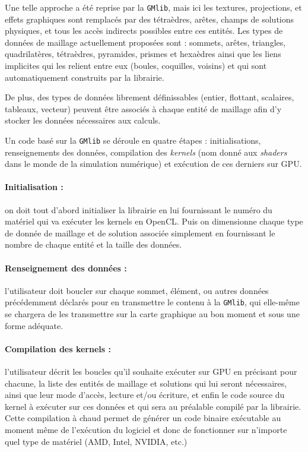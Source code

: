 \documentclass[a4paper,12pt]{article}
\begin{document}
Une telle approche a été reprise par la {\tt GMlib}, mais ici les textures, projections, et effets graphiques sont remplacés par des tétraèdres, arêtes, champs de solutions physiques, et tous les accès indirects possibles entre ces entités.
Les types de données de maillage actuellement proposées sont : sommets, arêtes, triangles, quadrilatères, tétraèdres, pyramides, prismes et hexaèdres ainsi que les liens implicites qui les relient entre eux (boules, coquilles, voisins) et qui sont automatiquement construits par la librairie.

De plus, des types de données librement définissables (entier, flottant, scalaires, tableaux, vecteur) peuvent être associés à chaque entité de maillage afin d'y stocker les données nécessaires aux calculs.

Un code basé sur la {\tt GMlib} se déroule en quatre étapes : initialisations, renseignements des données, compilation des \emph{kernels} (nom donné aux \emph{shaders} dans le monde de la simulation numérique) et exécution de ces derniers sur GPU.

\paragraph{Initialisation :} on doit tout d'abord initialiser la librairie en lui fournissant le numéro du matériel qui va exécuter les kernels en OpenCL. Puis on dimensionne chaque type de donnée de maillage et de solution associée simplement en fournissant le nombre de chaque entité et la taille des données.

\paragraph{Renseignement des données :} l'utilisateur doit boucler sur chaque sommet, élément, ou autres données précédemment déclarés pour en transmettre le contenu à la {\tt GMlib}, qui elle-même se chargera de les transmettre sur la carte graphique au bon moment et sous une forme adéquate.

\paragraph{Compilation des kernels :} l'utilisateur décrit les boucles qu'il souhaite exécuter sur GPU en précisant pour chacune, la liste des entités de maillage et solutions qui lui seront nécessaires, ainsi que leur mode d'accès, lecture et/ou écriture, et enfin le code source du kernel à exécuter sur ces données et qui sera au préalable compilé par la librairie.
Cette compilation à chaud permet de générer un code binaire exécutable au moment même de l'exécution du logiciel et donc de fonctionner sur n'importe quel type de matériel (AMD, Intel, NVIDIA, etc.)
\end{document}
